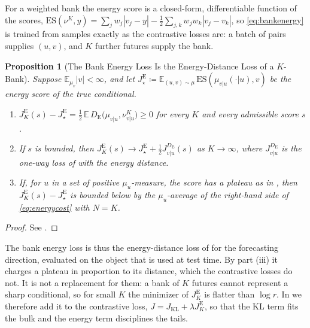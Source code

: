 \documentclass[11pt]{article}
\theoremstyle{plain}
\newtheorem{proposition}[theorem]{Proposition}
\theoremstyle{definition}
\theoremstyle{remark}
\newcommand{\E}{\mathbb{E}}
\newcommand{\define}{\coloneqq}
\newcommand{\DE}{D_{\mathrm{E}}}
\newcommand{\abs}[1]{\left\lvert #1 \right\rvert}
\newcommand{\Jvu}{J_{v\vert u}}
\begin{document}
For a weighted bank the energy score is a closed-form, differentiable function
of the scores,
$\mathrm{ES}(\nu^{K},y)=\sum_{j}w_j\abs{v_j-y}-\tfrac12\sum_{j,k}w_jw_k\abs{v_j-v_k}$,
so \eqref{eq:bankenergy} is trained from samples exactly as the contrastive
losses are: a batch of pairs supplies $(u,v)$, and $K$ further futures supply
the bank.

\begin{proposition}[The Bank Energy Loss Is the Energy-Distance Loss of a $K$-Bank]
 \label{prop:bankenergy}
 Suppose $\E_{\mu_v}\abs{v}<\infty$, and let
 $J^{\mathrm{E}}_{\star}\define\E_{(u,v)\sim\mu}\,\mathrm{ES}(\mu_{v\vert u}(\cdot\vert u),v)$
 be the energy score of the true conditional.
 \begin{enumerate}[label=(\roman*)]
  \item $J^{\mathrm{E}}_{K}(s)-J^{\mathrm{E}}_{\star}
         =\tfrac12\,\E\,\DE\bigl(\mu_{v\vert u},\nu^{K}_{v\vert u}\bigr)\ge0$
        for every $K$ and every admissible score $s$.
  \item If $s$ is bounded, then
        $J^{\mathrm{E}}_{K}(s)\to J^{\mathrm{E}}_{\star}+\tfrac12\Jvu^{\DE}(s)$
        as $K\to\infty$, where $\Jvu^{\DE}$ is the one-way loss of
         with the energy distance.
  \item If, for $u$ in a set of positive $\mu_u$-measure, the score has a
        plateau as in , then
        $J^{\mathrm{E}}_{K}(s)-J^{\mathrm{E}}_{\star}$ is bounded below by the
        $\mu_u$-average of the right-hand side of \eqref{eq:energycost} with
        $N=K$.
 \end{enumerate}
\end{proposition}
\begin{proof}
 See .
\end{proof}

The bank energy loss is thus the energy-distance loss of
\cite[Rem.~3.5]{baptista2025mathematical} for the forecasting direction,
evaluated on the object that is used at test time. By part (iii) it charges a
plateau in proportion to its distance, which the contrastive losses do not.
It is not a replacement for them: a bank of $K$ futures cannot represent a
sharp conditional, so for small $K$ the minimizer of $J^{\mathrm{E}}_{K}$ is
flatter than $\log r$. In  we therefore add it to
the contrastive loss, $J=J_{\mathrm{KL}}+\lambda J^{\mathrm{E}}_{K}$, so that
the KL term fits the bulk and the energy term disciplines the tails.
\end{document}

